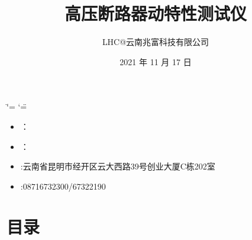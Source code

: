 \documentclass[a4paper,10pt,english]{sphinxmanual}
\title{高压断路器动特性测试仪}
\date{2021 年 11 月 17 日}
\author{LHC@云南兆富科技有限公司}
\begin{document}
\ifdefined\shorthandoff
  \ifnum\catcode`\=\string=\active\shorthandoff{=}\fi
  \ifnum\catcode`\"=\active{}\fi
\fi

\pagestyle{empty}
\sphinxmaketitle
\pagestyle{plain}
\sphinxtableofcontents
\pagestyle{normal}
\label{\detokenize{index::doc}}


\begin{figure}[htbp]
\centering

\noindent{}
\end{figure}
\begin{itemize}
\item {} 
\sphinxAtStartPar
{}：

\item {} 
\sphinxAtStartPar
{}：

\item {} 
\sphinxAtStartPar
{}:云南省昆明市经开区云大西路39号创业大厦C栋202室

\item {} 
\sphinxAtStartPar
{}:0871\sphinxhyphen{}6732300/67322190

\end{itemize}


\chapter{目录}
\label{\detokenize{index:id2}}
\end{document}
